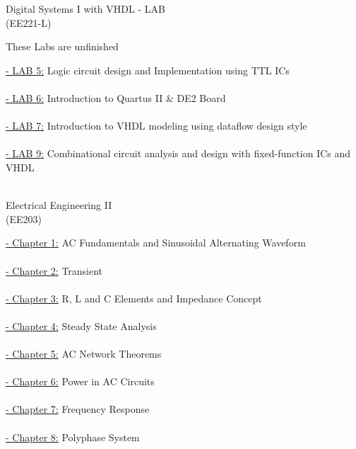 \documentclass[12pt, a4paper]{article}
\begin{document}
\newpage 
\begin{center}
\Huge 
Digital Systems I with VHDL - LAB  \\ (EE221-L) %
\end{center}

\begin{center} \normalsize These Labs are unfinished \end{center}
\large \underline{- LAB 5:} Logic circuit design and Implementation using TTL ICs \\ \\
\large \underline{- LAB 6:} Introduction to Quartus II \& DE2 Board\\ \\
\large \underline{- LAB 7:} Introduction to VHDL modeling using dataflow design style \\ \\
\large \underline{- LAB 9:} Combinational circuit analysis and design with fixed-function ICs and VHDL\\ \\


\newpage 
\begin{center}
\Huge 
Electrical Engineering II \\ (EE203)
\end{center}
\normalsize
\large \underline{- Chapter 1:} AC Fundamentals and Sinusoidal Alternating Waveform\\ \\
\large \underline{- Chapter 2:} Transient\\ \\
\large \underline{- Chapter 3:} R, L and C Elements and Impedance Concept\\ \\
\large \underline{- Chapter 4:} Steady State Analysis\\ \\
\large \underline{- Chapter 5:} AC Network Theorems\\ \\
\large \underline{- Chapter 6:} Power in AC Circuits\\ \\
\large \underline{- Chapter 7:} Frequency Response\\ \\
\large \underline{- Chapter 8:} Polyphase System \\ \\
\end{document}

